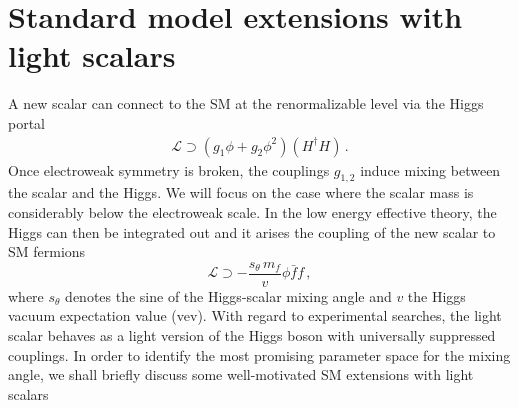 \documentclass[preprintnumbers,twocolumn,aps,floats,nofootinbib]{revtex4-1}
\begin{document}
\section{Standard model extensions with light scalars}\label{sec:models}
A new scalar can connect to the SM at the renormalizable level via the Higgs portal
\begin{align}
 \mathcal{L} \supset
\left(g_1 \phi + g_2 \phi^2\right) \left(H^\dagger H\right) \,.
\end{align}
Once electroweak symmetry is broken, the couplings $g_{1,2}$ induce mixing between the scalar and the Higgs. We will focus on the case where the scalar mass is considerably below the electroweak scale. In the low energy effective theory, the Higgs can then be integrated out and it arises the coupling of the new scalar to SM fermions
\begin{equation}
 \mathcal{L}\supset- \frac{s_{\theta}\,m_f}{v} \phi \bar{f}f\,,
\end{equation}
where $s_{\theta}$ denotes the sine of the Higgs-scalar mixing angle and $v$ the Higgs vacuum expectation value (vev). With regard to experimental searches, the light scalar behaves as a light version of the Higgs boson with universally suppressed couplings. In order to identify the most promising parameter space for the mixing angle, we shall briefly discuss some well-motivated SM extensions with light scalars
\end{document}
